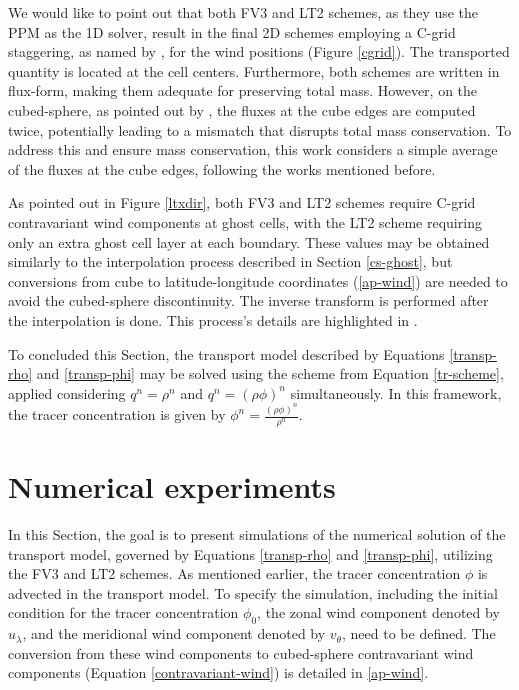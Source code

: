 \documentclass[preprint,12pt]{elsarticle}
\begin{document}
\begin{linenumbers}
We would like to point out that both FV3 and LT2 schemes, as they use the PPM as the 1D solver, result in the final 2D schemes employing a C-grid staggering, as named by \cite{arakawa:1977}, for the wind positions (Figure \ref{cgrid}). 
The transported quantity is located at the cell centers.
Furthermore, both schemes are written in flux-form, making them adequate for preserving total mass. 
However, on the cubed-sphere, as pointed out by \cite{ross:2006,chen:2021,mouallem:2023}, the fluxes at the cube edges are computed twice, potentially leading to a mismatch that disrupts total mass conservation. 
To address this and ensure mass conservation, this work considers a simple average of the fluxes at the cube edges, following the works mentioned before.

As pointed out in Figure \ref{ltxdir}, both FV3 and LT2 schemes require C-grid contravariant wind components at ghost cells, with the LT2 scheme requiring only an extra ghost cell layer at each boundary.
These values may be obtained similarly to the interpolation process described in Section \ref{cs-ghost}, but conversions from cube to latitude-longitude coordinates (\ref{ap-wind}) are needed to avoid the cubed-sphere discontinuity. The inverse transform is performed after the interpolation is done.
This process's details are highlighted in \cite[Section 2.3]{mouallem:2023}.

To concluded this Section, the transport model described by Equations \eqref{transp-rho} and \eqref{transp-phi} may be solved using the scheme from Equation \eqref{tr-scheme}, applied considering $q^n=\rho^n$ and $q^n=(\rho \phi)^n$ simultaneously.
In this framework, the tracer concentration is given by $\phi^n = \frac{(\rho \phi)^n}{\rho^n}$.

\section{Numerical experiments}
\label{num-exp}
In this Section, the goal is to present simulations of the numerical solution of the transport model, governed by Equations \eqref{transp-rho} and \eqref{transp-phi}, utilizing the FV3 and LT2 schemes. As mentioned earlier, the tracer concentration $\phi$ is advected in the transport model.
To specify the simulation, including the initial condition for the tracer concentration $\phi_0$, the zonal wind component  denoted by $u_\lambda$, and the meridional wind component denoted by $v_\theta$, need to be defined.
The conversion from these wind components to cubed-sphere contravariant wind components (Equation \eqref{contravariant-wind}) is detailed in \ref{ap-wind}.


\end{linenumbers}
\end{document}
